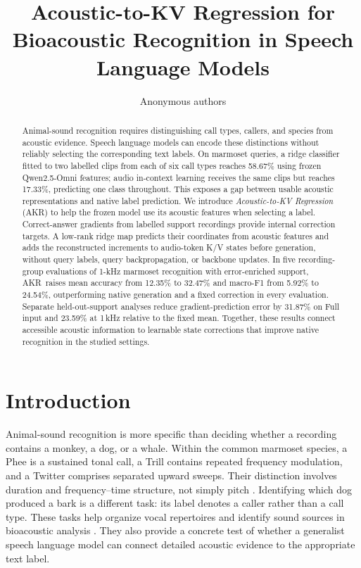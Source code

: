 \documentclass{article}
\title{Acoustic-to-KV Regression for\\
Bioacoustic Recognition in Speech Language Models}
\author{Anonymous authors}
\newcommand{\method}{AKR}
\begin{document}
\maketitle
{}

\begin{abstract}
Animal-sound recognition requires distinguishing call types, callers, and species from acoustic evidence. Speech language models can encode these distinctions without reliably selecting the corresponding text labels. On marmoset queries, a ridge classifier fitted to two labelled clips from each of six call types reaches 58.67\% using frozen Qwen2.5-Omni features; audio in-context learning receives the same clips but reaches 17.33\%, predicting one class throughout. This exposes a gap between usable acoustic representations and native label prediction. We introduce \emph{Acoustic-to-KV Regression} (\method) to help the frozen model use its acoustic features when selecting a label. Correct-answer gradients from labelled support recordings provide internal correction targets. A low-rank ridge map predicts their coordinates from acoustic features and adds the reconstructed increments to audio-token K/V states before generation, without query labels, query backpropagation, or backbone updates. In five recording-group evaluations of 1-kHz marmoset recognition with error-enriched support, \method\ raises mean accuracy from 12.35\% to 32.47\% and macro-F1 from 5.92\% to 24.54\%, outperforming native generation and a fixed correction in every evaluation. Separate held-out-support analyses reduce gradient-prediction error by 31.87\% on Full input and 23.59\% at 1\,kHz relative to the fixed mean. Together, these results connect accessible acoustic information to learnable state corrections that improve native recognition in the studied settings.
\end{abstract}

\section{Introduction}
Animal-sound recognition is more specific than deciding whether a recording contains a monkey, a dog, or a whale. Within the common marmoset species, a Phee is a sustained tonal call, a Trill contains repeated frequency modulation, and a Twitter comprises separated upward sweeps. Their distinction involves duration and frequency--time structure, not simply pitch \citep{dimattina2006virtual,agamaite2015quantitative}. Identifying which dog produced a bark is a different task: its label denotes a caller rather than a call type. These tasks help organize vocal repertoires and identify sound sources in bioacoustic analysis \citep{lamothe2025marmaudio,hagiwara2022beans}. They also provide a concrete test of whether a generalist speech language model can connect detailed acoustic evidence to the appropriate text label.
\end{document}
